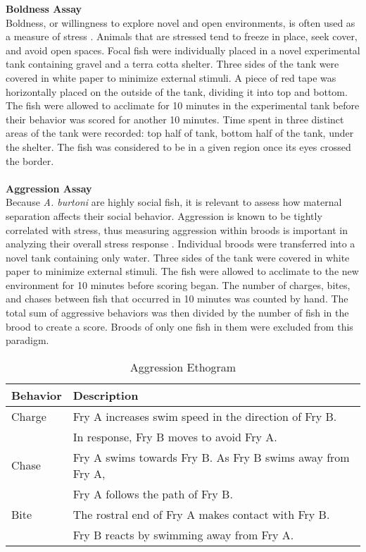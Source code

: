 \documentclass[12pt,twoside]{reedthesis}
\begin{document}
\noindent\textbf{Boldness Assay}\\
Boldness, or willingness to explore novel and open environments, is often used
as a measure of stress \citep{bannier_early_2017, francis_nongenomic_1999}. Animals that are stressed tend to freeze in place, seek
cover, and avoid open spaces. Focal fish were individually placed in a novel
experimental tank
containing gravel and a terra cotta shelter. Three sides of the tank were
covered in white paper to minimize external stimuli. A piece of red tape was
horizontally placed on the outside of the tank, dividing it into top and bottom.
The fish were allowed to acclimate for
10 minutes in the experimental tank before their behavior was scored for another
10 minutes. Time spent in three distinct areas of the tank were recorded: top half of tank,
bottom half of the tank, under the shelter. The fish was
considered to be in a given region once its eyes crossed the border.\\
\\
\noindent\textbf{Aggression Assay}\\
Because \textit{A. burtoni} are highly social fish, it is relevant to assess how
maternal separation affects their social behavior. Aggression is known to be
tightly correlated with stress, thus measuring aggression within broods is
important in analyzing their overall stress response \citep{gammie_effects_2006,
overli_behavioral_2004, honess_behavioural_2006, takahashi_aggression_2018}. Individual broods were
transferred into a novel tank containing only water. Three sides of the tank were
covered in white paper to minimize external stimuli. The fish were allowed
to acclimate to the new environment for 10 minutes before scoring began. The
number of charges, bites, and chases between fish that occurred in 10 minutes
was counted by hand. The total sum of aggressive behaviors was then divided by
the number of fish in the brood to create a score. Broods of only one fish in them were excluded from this paradigm.  

\begin{table}[htbp]
\caption[Aggression Ethogram]{Aggression Ethogram}
\begin{center}
\footnotesize
\begin{tabular}{ | l | l |}
\hline
\textbf{Behavior} & \textbf{Description}\\
\hline
  Charge & Fry A increases swim speed in the direction of Fry B. \\
  & In response, Fry B moves to avoid Fry A. \\
\hline
  Chase & Fry A swims towards Fry B. As Fry B swims away from Fry A,\\
  & Fry A follows the path of Fry B.\\
\hline
  Bite & The rostral end of Fry A makes contact with Fry B.\\
  & Fry B reacts by swimming away from Fry A. \\
\hline
\end{tabular}
\end{center}
\end{table}
\end{document}
